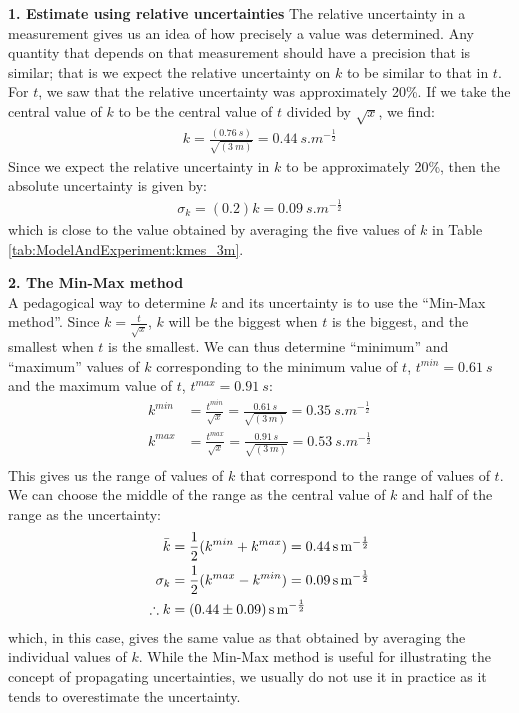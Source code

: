 \textbf{1. Estimate using relative uncertainties}
The relative uncertainty in a measurement gives us an idea of how precisely a value was determined. Any quantity that depends on that measurement should have a precision that is similar; that is we expect the relative uncertainty on $k$ to be similar to that in $t$. For $t$, we saw that the relative uncertainty was approximately 20\%. If we take the central value of $k$ to be the central value of $t$ divided by $\sqrt x$, we find:
\begin{align*}
k=\frac{(\SI{0.76}{s})}{\sqrt{(\SI{3}{m})}}=\SI{0.44}{s.m^{-\frac{1}{2}}}
\end{align*} 
Since we expect the relative uncertainty in $k$ to be approximately 20\%, then the absolute uncertainty is given by:
\begin{align*}
\sigma_k = (0.2) k=\SI{0.09}{s.m^{-\frac{1}{2}}}
\end{align*}
which is close to the value obtained by averaging the five values of $k$ in Table \ref{tab:ModelAndExperiment:kmes_3m}.

\textbf{2. The Min-Max method}\\
A pedagogical way to determine $k$ and its uncertainty is to use the ``Min-Max method''. Since $k=\frac{t}{\sqrt x}$, $k$ will be the biggest when $t$ is the biggest, and the smallest when $t$ is the smallest. We can thus determine ``minimum'' and ``maximum'' values of $k$ corresponding to the minimum value of $t$, $t^{min}=\SI{0.61}{s}$ and the maximum value of $t$, $t^{max}=\SI{0.91}{s}$:
\begin{align*}
k^{min} &= \frac{t^{min}}{\sqrt x}=\frac{0.61\,s}{\sqrt{(3\,m)}} = \SI{0.35}{s.m^{-\frac{1}{2}}}\\
k^{max} &= \frac{t^{max}}{\sqrt x}=\frac{0.91\,s}{\sqrt{(3\,m)}} = \SI{0.53}{s.m^{-\frac{1}{2}}}\\
\end{align*}
This gives us the range of values of $k$ that correspond to the range of values of $t$. We can choose the middle of the range as the central value of $k$ and half of the range as the uncertainty:
\begin{align*}
\bar k &= \frac{1}{2}(k^{min}+k^{max})= \SI{0.44}{s.m^{-\frac{1}{2}}}\\
\sigma_k &= \frac{1}{2}(k^{max}-k^{min})= \SI{0.09}{s.m^{-\frac{1}{2}}}\\
\therefore k&= \SI{0.44 \pm 0.09}{s.m^{-\frac{1}{2}}}
\end{align*}
which, in this case, gives the same value as that obtained by averaging the individual values of $k$. While the Min-Max method is useful for illustrating the concept of propagating uncertainties, we usually do not use it in practice as it tends to overestimate the uncertainty. 


